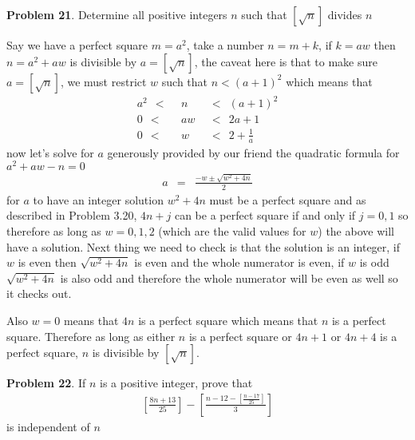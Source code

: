 \documentclass[aps,preprint,preprintnumbers,nofootinbib,showpacs,prd]{revtex4-1}
\newcommand{\nbea}{\begin{eqnarray*}}
\newcommand{\neea}{\end{eqnarray*}}
\begin{document}
{\bf Problem 21}. Determine all positive integers $n$ such that $[\sqrt{n}]$ divides $n$

Say we have a perfect square $m = a^2$, take a number $n=m+k$, if $k = aw$ then $n=a^2+aw$ is divisible by $a=[\sqrt{n}]$, the caveat here is that to make sure $a = [\sqrt{n}]$, we must restrict $w$ such that $n < (a+1)^2$ which means that
%
\nbea
a^2 ~~<~~& n & ~~<~~ (a+1)^2 \\
0 ~~<~~ & aw & ~~<~~ 2a + 1 \\
0 ~~<~~ & w & ~~<~~ 2 + \frac{1}{a}
\neea
%
now let's solve for $a$ generously provided by our friend the quadratic formula for $a^2 + aw - n = 0$
%
\nbea
a & = & \frac{-w\pm\sqrt{w^2+4n}}{2}
\neea
%
for $a$ to have an integer solution $w^2+4n$ must be a perfect square and as described in Problem 3.20, $4n+j$ can be a perfect square if and only if $j=0,1$ so therefore as long as $w=0,1,2$ (which are the valid values for $w$) the above will have a solution. Next thing we need to check is that the solution is an integer, if $w$ is even then $\sqrt{w^2 + 4n}$ is even and the whole numerator is even, if $w$ is odd $\sqrt{w^2 + 4n}$ is also odd and therefore the whole numerator will be even as well so it checks out.

Also $w=0$ means that $4n$ is a perfect square which means that $n$ is a perfect square. Therefore as long as either $n$ is a perfect square or $4n+1$ or $4n+4$ is a perfect square, $n$ is divisible by $[\sqrt{n}]$.

{\bf Problem 22}. If $n$ is a positive integer, prove that
%
\nbea
\left \lbrack \frac{8n + 13}{25} \right \rbrack - \left \lbrack \frac{n - 12 - \left \lbrack \frac{n-17}{25}\right \rbrack}{3} \right \rbrack
\neea
%
is independent of $n$
\end{document}
